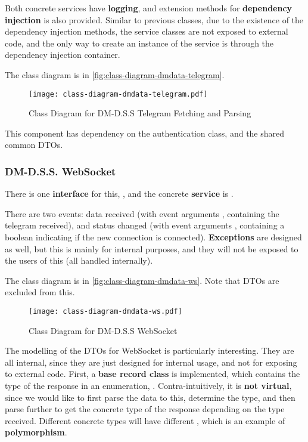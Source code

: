 Both concrete services have \textbf{logging}, and extension methods for \textbf{dependency injection} is also provided. Similar to previous classes, due to the existence of the dependency injection methods, the service classes are not exposed to external code, and the only way to create an instance of the service is through the dependency injection container.

The class diagram is in \autoref{fig:class-diagram-dmdata-telegram}.

\begin{figure}[htp]
    \centering
    \texttt{[image: class-diagram-dmdata-telegram.pdf]}
    \caption{Class Diagram for DM-D.S.S Telegram Fetching and Parsing}
    \label{fig:class-diagram-dmdata-telegram}
\end{figure}

This component has dependency on the authentication class, and the shared common DTOs.

\subsubsection{DM-D.S.S. WebSocket}

There is one \textbf{interface} for this, , and the concrete \textbf{service} is .

There are two events: data received (with event arguments , containing the telegram received), and status changed (with event arguments , containing a boolean indicating if the new connection is connected). \textbf{Exceptions} are designed as well, but this is mainly for internal purposes, and they will not be exposed to the users of this (all handled internally).

The class diagram is in \autoref{fig:class-diagram-dmdata-ws}. Note that DTOs are excluded from this.

\begin{figure}[htp]
    \centering
    \texttt{[image: class-diagram-dmdata-ws.pdf]}
    \caption{Class Diagram for DM-D.S.S WebSocket}
    \label{fig:class-diagram-dmdata-ws}
\end{figure}


The modelling of the DTOs for WebSocket is particularly interesting. They are all internal, since they are just designed for internal usage, and not for exposing to external code. First, a \textbf{base record class}  is implemented, which contains the type of the response in an enumeration, . Contra-intuitively, it is \textbf{not virtual}, since we would like to first parse the data to this, determine the type, and then parse further to get the concrete type of the response depending on the type received. Different concrete types will have different , which is an example of \textbf{polymorphism}.

